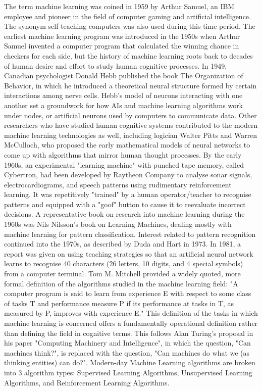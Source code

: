 The term machine learning was coined in 1959 by Arthur Samuel, an IBM employee and pioneer in the field of computer gaming and artificial intelligence. The synonym self-teaching computers was also used during this time period.
The earliest machine learning program was introduced in the 1950s when Arthur Samuel invented a computer program that calculated the winning chance in checkers for each side, but the history of machine learning roots back to decades of human desire and effort to study human cognitive processes. In 1949, Canadian psychologist Donald Hebb published the book The Organization of Behavior, in which he introduced a theoretical neural structure formed by certain interactions among nerve cells. Hebb's model of neurons interacting with one another set a groundwork for how AIs and machine learning algorithms work under nodes, or artificial neurons used by computers to communicate data. Other researchers who have studied human cognitive systems contributed to the modern machine learning technologies as well, including logician Walter Pitts and Warren McCulloch, who proposed the early mathematical models of neural networks to come up with algorithms that mirror human thought processes.
By the early 1960s, an experimental "learning machine" with punched tape memory, called Cybertron, had been developed by Raytheon Company to analyse sonar signals, electrocardiograms, and speech patterns using rudimentary reinforcement learning. It was repetitively "trained" by a human operator/teacher to recognise patterns and equipped with a "goof" button to cause it to reevaluate incorrect decisions. A representative book on research into machine learning during the 1960s was Nils Nilsson's book on Learning Machines, dealing mostly with machine learning for pattern classification. Interest related to pattern recognition continued into the 1970s, as described by Duda and Hart in 1973. In 1981, a report was given on using teaching strategies so that an artificial neural network learns to recognise 40 characters (26 letters, 10 digits, and 4 special symbols) from a computer terminal.
Tom M. Mitchell provided a widely quoted, more formal definition of the algorithms studied in the machine learning field: "A computer program is said to learn from experience E with respect to some class of tasks T and performance measure P if its performance at tasks in T, as measured by P,  improves with experience E." This definition of the tasks in which machine learning is concerned offers a fundamentally operational definition rather than defining the field in cognitive terms. This follows Alan Turing's proposal in his paper "Computing Machinery and Intelligence", in which the question, "Can machines think?", is replaced with the question, "Can machines do what we (as thinking entities) can do?".
Modern-day Machine Learning algorithms are broken into 3 algorithm types: Supervised Learning Algorithms, Unsupervised Learning Algorithms, and Reinforcement Learning Algorithms.

